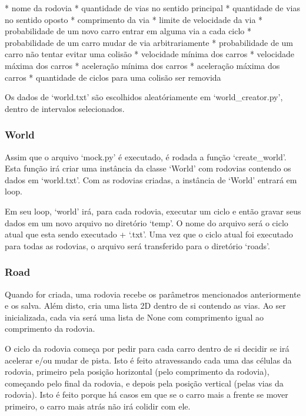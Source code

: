 \documentclass{article}
\begin{document}
    * nome da rodovia
    * quantidade de vias no sentido principal
    * quantidade de vias no sentido oposto
    * comprimento da via
    * limite de velocidade da via
    * probabilidade de um novo carro entrar em alguma via a cada ciclo
    * probabilidade de um carro mudar de via arbitrariamente
    * probabilidade de um carro não tentar evitar uma colisão
    * velocidade mínima dos carros
    * velocidade máxima dos carros
    * aceleração mínima dos carros
    * aceleração máxima dos carros
    * quantidade de ciclos para uma colisão ser removida

    Os dados de `world.txt' são escolhidos aleatóriamente em `world\_creator.py', dentro de intervalos selecionados.

    \subsubsection{World}
    Assim que o arquivo `mock.py' é executado, é rodada a função `create\_world'. Esta função irá criar uma instância
    da classe `World' com rodovias contendo os dados em `world.txt'. Com as rodovias criadas, a instância de `World'
    entrará em loop.

    Em seu loop, `world' irá, para cada rodovia, executar um ciclo e então gravar seus dados em um novo arquivo no
    diretório `temp'. O nome do arquivo será o ciclo atual que esta sendo executado + `.txt'. Uma vez que o ciclo
    atual foi executado para todas as rodovias, o arquivo será transferido para o diretório `roads'.


    \subsubsection{Road}
    Quando for criada, uma rodovia recebe os parâmetros mencionados anteriormente e os salva. Além disto, cria
    uma lista 2D dentro de si contendo as vias. Ao ser inicializada, cada via será uma lista de None com comprimento
    igual ao comprimento da rodovia.

    O ciclo da rodovia começa por pedir para cada carro dentro de si decidir se irá acelerar e/ou mudar de pista.
    Isto é feito atravessando cada uma das células da rodovia, primeiro pela posição horizontal (pelo comprimento
    da rodovia), começando pelo final da rodovia, e depois pela posição vertical (pelas vias da rodovia). Isto é
    feito porque há casos em que se o carro mais a frente se mover primeiro, o carro mais atrás não irá colidir com
    ele.
\end{document}
